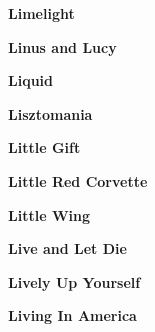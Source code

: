 \begin{center}\textbf{Limelight}\end{center}
\newline
\vspace{10pt} 
\begin{center}\textbf{Linus and Lucy}\end{center}
\newline
\vspace{10pt} 
\begin{center}\textbf{Liquid}\end{center}
\newline
\vspace{10pt} 
\begin{center}\textbf{Lisztomania}\end{center}
\newline
\vspace{10pt} 
\begin{center}\textbf{Little Gift}\end{center}
\newline
\vspace{10pt} 
\begin{center}\textbf{Little Red Corvette}\end{center}
\newline
\vspace{10pt} 
\begin{center}\textbf{Little Wing}\end{center}
\newline
\vspace{10pt} 
\begin{center}\textbf{Live and Let Die}\end{center}
\newline
\vspace{10pt} 
\begin{center}\textbf{Lively Up Yourself}\end{center}
\newline
\vspace{10pt} 
\begin{center}\textbf{Living In America}\end{center}
\newline
